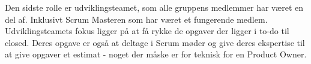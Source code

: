 Den sidste rolle er udviklingsteamet, som alle gruppens medlemmer har været en del af. Inklusivt Scrum Masteren som har været et fungerende medlem. Udviklingsteamets fokus ligger på at få rykke de opgaver der ligger i to-do til closed. Deres opgave er også at deltage i Scrum møder og give deres ekspertise til at give opgaver et estimat - noget der måske er for teknisk for en Product Owner.